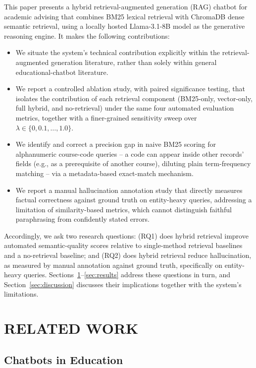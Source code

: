 \documentclass[a4paper,twoside]{article}
\begin{document}
This paper presents a hybrid retrieval-augmented generation (RAG) chatbot for academic advising that combines BM25 lexical retrieval with ChromaDB dense semantic retrieval, using a locally hosted Llama-3.1-8B model as the generative reasoning engine. It makes the following contributions:

\begin{itemize}
  \item We situate the system's technical contribution explicitly within the retrieval-augmented generation literature, rather than solely within general educational-chatbot literature.
  \item We report a controlled ablation study, with paired significance testing, that isolates the contribution of each retrieval component (BM25-only, vector-only, full hybrid, and no-retrieval) under the same four automated evaluation metrics, together with a finer-grained sensitivity sweep over $\lambda\in\{0,0.1,\ldots,1.0\}$.
  \item We identify and correct a precision gap in naive BM25 scoring for alphanumeric course-code queries -- a code can appear inside other records' fields (e.g., as a prerequisite of another course), diluting plain term-frequency matching -- via a metadata-based exact-match mechanism.
  \item We report a manual hallucination annotation study that directly measures factual correctness against ground truth on entity-heavy queries, addressing a limitation of similarity-based metrics, which cannot distinguish faithful paraphrasing from confidently stated errors.
\end{itemize}

Accordingly, we ask two research questions: (RQ1) does hybrid retrieval improve automated semantic-quality scores relative to single-method retrieval baselines and a no-retrieval baseline; and (RQ2) does hybrid retrieval reduce hallucination, as measured by manual annotation against ground truth, specifically on entity-heavy queries. Sections~\ref{sec:related}--\ref{sec:results} address these questions in turn, and Section~\ref{sec:discussion} discusses their implications together with the system's limitations.

\section{\uppercase{Related Work}}
\label{sec:related}

\subsection{Chatbots in Education}
\end{document}
